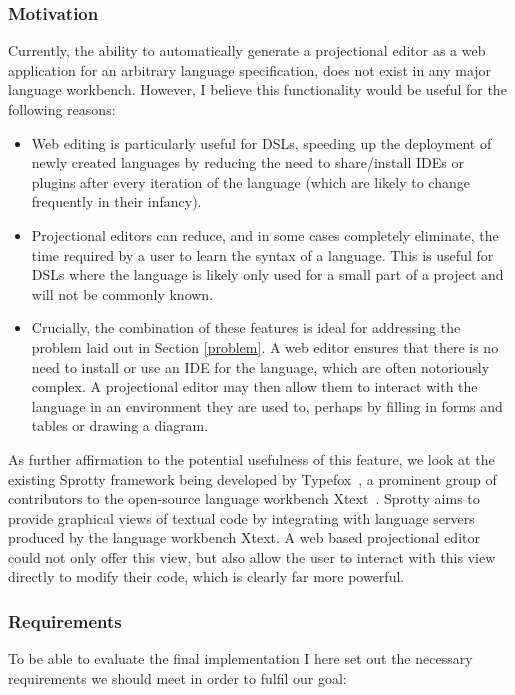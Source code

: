 \documentclass{article}
\begin{document}
\subsubsection{Motivation}\label{motivation}
Currently, the ability to automatically generate a projectional editor as a web application for an arbitrary language specification, does not exist in any major language workbench. However, I believe this functionality would be useful for the following reasons:
\begin{itemize}
\item Web editing is particularly useful for DSLs, speeding up the deployment of newly created languages by reducing the need to share/install IDEs or plugins after every iteration of the language (which are likely to change frequently in their infancy). 
\item Projectional editors can reduce, and in some cases completely eliminate, the time required by a user to learn the syntax of a language. This is useful for DSLs where the language is likely only used for a small part of a project and will not be commonly known.
\item Crucially, the combination of these features is ideal for addressing the problem laid out in Section \ref{problem}. A web editor ensures that there is no need to install or use an IDE for the language, which are often notoriously complex. A projectional editor may then allow them to interact with the language in an environment they are used to, perhaps by filling in forms and tables or drawing a diagram.  
\end{itemize} 
As further affirmation to the potential usefulness of this feature, we look at the existing Sprotty framework being developed by Typefox~\cite{sprotty}, a prominent group of contributors to the open-source language workbench Xtext~\cite{xtext}. Sprotty aims to provide graphical views of textual code by integrating with language servers produced by the language workbench Xtext. A web based projectional editor could not only offer this view, but also allow the user to interact with this view directly to modify their code, which is clearly far more powerful. 

\subsubsection{Requirements}\label{requirements}
To be able to evaluate the final implementation I here set out the necessary requirements we should meet in order to fulfil our goal: 
\end{document}
